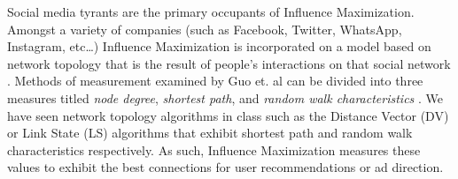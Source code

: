 \documentclass[12pt]{article}
\begin{document}
Social media tyrants are the primary occupants of Influence Maximization. 
Amongst a variety of companies (such as Facebook, Twitter, WhatsApp, Instagram, etc\ldots) Influence Maximization is incorporated on a model based on network topology that is the result of people's interactions on that social network \cite{9045797}. 
Methods of measurement examined by Guo et. al can be divided into three measures titled \emph{node degree}, \emph{shortest path}, and \emph{random walk characteristics} \cite{9045797}. 
We have seen network topology algorithms in class such as the Distance Vector (DV) or Link State (LS) algorithms that exhibit shortest path and random walk characteristics respectively. 
As such, Influence Maximization measures these values to exhibit the best connections for user recommendations or ad direction.



\begin{thebibliography}{99}	%
\nocite{*}

\end{thebibliography}
\end{document}

